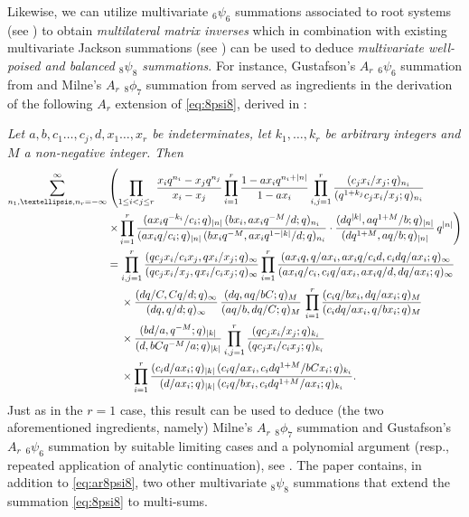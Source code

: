 \documentclass[reqno,12pt]{amsart}
\theoremstyle{remark}
\numberwithin{equation}{section}
\begin{document}
Likewise, we can utilize multivariate ${}_6\psi_6$ summations associated to
root systems (see \cite[Section~2.4]{S8}) to obtain \textit{multilateral
  matrix inverses}
which in combination with existing multivariate Jackson summations
(see \cite[Section~2.3]{S8}) can be used to deduce
\textit{multivariate well-poised and balanced ${}_8\psi_8$ summations}.
For instance, Gustafson's $A_r$ $_6\psi_6$
summation from \cite[Theorem~1.15]{G} and Milne's $A_r$ $_8\phi_7$
summation from \cite[Theorem~6.17]{M1} served as ingredients
in the derivation of the following $A_r$ extension of \eqref{eq:8psi8},
derived in \cite[Theorem~4.1]{S7}:

\textit{Let $a,b,c_1\ldots,c_j,d,x_1\ldots,x_r$ be indeterminates,
  let $k_1,\ldots,k_r$ be arbitrary integers and $M$ a non-negative integer.
  Then}
\begin{align}\label{eq:ar8psi8}
\sum_{n_1,\dots,n_r=-\infty}^{\infty}&\left(
\prod_{1\le i<j\le r}\frac {x_iq^{n_i}-x_jq^{n_j}}{x_i-x_j}
\prod_{i=1}^r\frac{1-ax_iq^{n_i+|n|}}{1-ax_i}
\prod_{i,j=1}^r\frac{(c_jx_i/x_j;q)_{n_i}}
{(q^{1+k_j}c_jx_i/x_j;q)_{n_i}}\right.\notag\\
&\left.\times
\prod_{i=1}^r\frac{(ax_iq^{-k_i}/c_i;q)_{|n|}\,
(bx_i,ax_iq^{-M}/d;q)_{n_i}}
{(ax_iq/c_i;q)_{|n|}\,
(bx_iq^{-M},ax_iq^{1-|k|}/d;q)_{n_i}}\cdot
\frac{(dq^{|k|},aq^{1+M}/b;q)_{|n|}}
{(dq^{1+M},aq/b;q)_{|n|}}\,q^{|n|}\right)\notag\\
&=\prod_{i,j=1}^r\frac{(qc_jx_i/c_ix_j,qx_i/x_j;q)_{\infty}}
{(qc_jx_i/x_j,qx_i/c_ix_j;q)_{\infty}}
\prod_{i=1}^r\frac{(ax_iq,q/ax_i,ax_iq/c_id,c_idq/ax_i;q)_{\infty}}
{(ax_iq/c_i,c_iq/ax_i,ax_iq/d,dq/ax_i;q)_{\infty}}\notag\\
&\quad\;\times
\frac{(dq/C,Cq/d;q)_{\infty}}{(dq,q/d;q)_{\infty}}\,
\frac{(dq,aq/bC;q)_M}{(aq/b,dq/C;q)_M}\,
\prod_{i=1}^r\frac{(c_iq/bx_i,dq/ax_i;q)_M}{(c_idq/ax_i,q/bx_i;q)_M}\notag\\
&\quad\;\times
\frac{(bd/a,q^{-M};q)_{|k|}}
{(d,bCq^{-M}/a;q)_{|k|}}
 \prod_{i,j=1}^r\frac{(qc_jx_i/x_j;q)_{k_i}}
{(qc_jx_i/c_ix_j;q)_{k_i}}\notag\\
&\quad\;\times
\prod_{i=1}^r\frac{(c_id/ax_i;q)_{|k|}\,
(c_iq/ax_i,c_idq^{1+M}/bCx_i;q)_{k_i}}
{(d/ax_i;q)_{|k|}\,(c_iq/bx_i,c_idq^{1+M}/ax_i;q)_{k_i}}.
\end{align}
Just as in the $r=1$ case, this result can be used to deduce
(the two aforementioned ingredients, namely) Milne's $A_r$ $_8\phi_7$
summation and Gustafson's $A_r$ $_6\psi_6$ summation by suitable
limiting cases and a polynomial argument
(resp., repeated application of analytic continuation),
see \cite[Remark~4.2]{S7}.
The paper \cite{S7} contains, in addition to \eqref{eq:ar8psi8},
two other multivariate $_8\psi_8$ summations that extend the summation
\eqref{eq:8psi8} to multi-sums.
\end{document}
